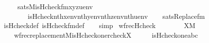 \begin{isabellebody}
\ \ \ \ {\isasymLongrightarrow}\ sats{\isacharparenleft}{\kern0pt}M{\isacharcomma}{\kern0pt}is{\isacharunderscore}{\kern0pt}Hcheck{\isacharunderscore}{\kern0pt}fm{\isacharparenleft}{\kern0pt}x{\isacharcomma}{\kern0pt}y{\isacharcomma}{\kern0pt}z{\isacharcomma}{\kern0pt}u{\isacharparenright}{\kern0pt}{\isacharcomma}{\kern0pt}env{\isacharparenright}{\kern0pt}\ {\isasymlongleftrightarrow}\isanewline
\ \ \ \ \ \ \ \ is{\isacharunderscore}{\kern0pt}Hcheck{\isacharparenleft}{\kern0pt}nth{\isacharparenleft}{\kern0pt}x{\isacharcomma}{\kern0pt}env{\isacharparenright}{\kern0pt}{\isacharcomma}{\kern0pt}nth{\isacharparenleft}{\kern0pt}y{\isacharcomma}{\kern0pt}env{\isacharparenright}{\kern0pt}{\isacharcomma}{\kern0pt}nth{\isacharparenleft}{\kern0pt}z{\isacharcomma}{\kern0pt}env{\isacharparenright}{\kern0pt}{\isacharcomma}{\kern0pt}nth{\isacharparenleft}{\kern0pt}u{\isacharcomma}{\kern0pt}env{\isacharparenright}{\kern0pt}{\isacharparenright}{\kern0pt}{\isachardoublequoteclose}\isanewline
%
\isadelimproof
\ \ %
\endisadelimproof
%
\isatagproof
{}\isamarkupfalse%
\ sats{\isacharunderscore}{\kern0pt}Replace{\isacharunderscore}{\kern0pt}fm\ \isamarkupfalse%
\ is{\isacharunderscore}{\kern0pt}Hcheck{\isacharunderscore}{\kern0pt}def\ is{\isacharunderscore}{\kern0pt}Hcheck{\isacharunderscore}{\kern0pt}fm{\isacharunderscore}{\kern0pt}def\isanewline
\ \ \isamarkupfalse%
\ simp%
\endisatagproof
{\isafoldproof}%
%
\isadelimproof
\isanewline
%
\endisadelimproof
\isanewline
\isanewline
\isanewline
{}\isamarkupfalse%
\ wfrec{\isacharunderscore}{\kern0pt}Hcheck\ {\isacharcolon}{\kern0pt}\isanewline
\ \ \isanewline
\ \ \ \ {\isachardoublequoteopen}X{\isasymin}M{\isachardoublequoteclose}\isanewline
\ \ \isanewline
\ \ \ \ {\isachardoublequoteopen}wfrec{\isacharunderscore}{\kern0pt}replacement{\isacharparenleft}{\kern0pt}{\isacharhash}{\kern0pt}{\isacharhash}{\kern0pt}M{\isacharcomma}{\kern0pt}is{\isacharunderscore}{\kern0pt}Hcheck{\isacharparenleft}{\kern0pt}one{\isacharparenright}{\kern0pt}{\isacharcomma}{\kern0pt}rcheck{\isacharparenleft}{\kern0pt}X{\isacharparenright}{\kern0pt}{\isacharparenright}{\kern0pt}{\isachardoublequoteclose}\isanewline
%
\isadelimproof
%
\endisadelimproof
%
\isatagproof
{}\isamarkupfalse%
\ {\isacharminus}{\kern0pt}\isanewline
\ \ \isamarkupfalse%
\ {\isachardoublequoteopen}is{\isacharunderscore}{\kern0pt}Hcheck{\isacharparenleft}{\kern0pt}one{\isacharcomma}{\kern0pt}a{\isacharcomma}{\kern0pt}b{\isacharcomma}{\kern0pt}c{\isacharparenright}{\kern0pt}\ {\isasymlongleftrightarrow}\isanewline

\end{isabellebody}
